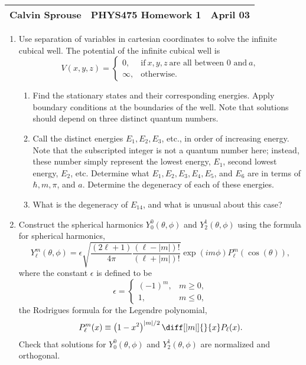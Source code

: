 \documentclass[a4paper, 12pt]{config/homework}
\begin{document}
\noindent
\begin{tabularx}{\textwidth}{>{\centering\arraybackslash}X>{\centering\arraybackslash}X>{\centering\arraybackslash}X}
Calvin Sprouse & PHYS475 Homework 1 & 2024 April 03\\
\midrule
\end{tabularx}

\begin{enumerate}
\item Use separation of variables in cartesian coordinates to solve the infinite cubical well. The potential of the infinite cubical well is
\[V(x,y,z)=\begin{cases}
0, & \text{if}\ x,y,z\ \text{are all between 0 and}\ a, \\
\infty, & \text{otherwise}.
\end{cases}\]
\begin{enumerate}[label=(\alph*.)]
\item Find the stationary states and their corresponding energies. Apply boundary conditions at the boundaries of the well. Note that solutions should depend on three distinct quantum numbers.



\item Call the distinct energies \(E_1,E_2,E_3\), etc., in order of increasing energy. Note that the subscripted integer is not a quantum number here; instead, these number simply represent the lowest energy, \(E_1\), second lowest energy, \(E_2\), etc. Determine what \(E_1,E_2,E_3,E_4,E_5\), and \(E_6\) are in terms of \(\hbar,m,\pi\), and \(a\). Determine the degeneracy of each of these energies.



\item What is the degeneracy of \(E_{14}\), and what is unusual about this case?



\end{enumerate}
\pagebreak
\item Construct the spherical harmonics \(Y_0^0(\theta,\phi)\) and \(Y_2^1(\theta,\phi)\) using the formula for spherical harmonics,
\[Y_\ell^m(\theta,\phi) = \epsilon\sqrt{\frac{(2\ell+1)}{4\pi}\frac{(\ell-|m|)!}{(\ell+|m|)!}}\exp(im\phi)P_\ell^m\left(\cos(\theta)\right),\]
where the constant \(\epsilon\) is defined to be
\[\epsilon = \begin{cases}
(-1)^m, & m \ge 0, \\ 1, & m \le 0,
\end{cases}\]
the Rodrigues formula for the Legendre polynomial,
\[P_\ell^m(x) \equiv \left(1-x^2\right)^{|m|/2}\diff[|m|]{}{x}P_\ell(x).\]
Check that solutions for \(Y_0^0(\theta,\phi)\) and \(Y_2^1(\theta,\phi)\) are normalized and orthogonal.



\end{enumerate}
\end{document}
